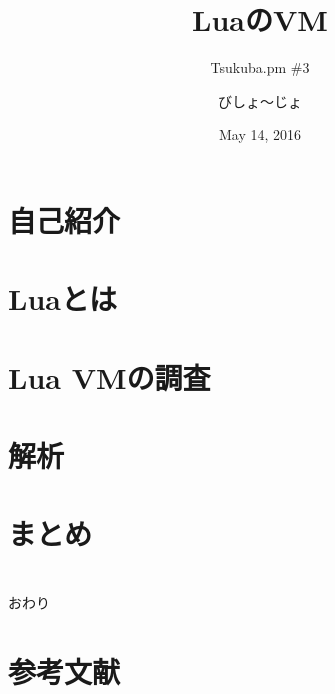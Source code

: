 \documentclass[aspectratio=169,unicode]{beamer}
\title{LuaのVM}
\subtitle{Tsukuba.pm \#{}3}
\author{びしょ〜じょ}
\date{May 14, 2016}
\begin{document}
\maketitle
\skipnexttoc
\section{自己紹介}

\section{Luaとは}

\section{Lua VMの調査}

\section{解析}

\section{まとめ}

\skipnexttoc
\section*{}
\begin{frame}
	\begin{center}
		\Huge{}おわり
	\end{center}
\end{frame}
\skipnexttoc
\section{参考文献}

\end{document}
